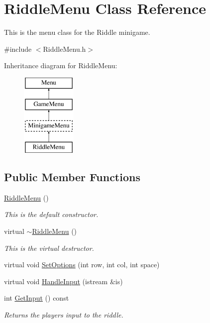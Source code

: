 \hypertarget{classRiddleMenu}{\section{Riddle\-Menu Class Reference}
\label{classRiddleMenu}
}


This is the menu class for the Riddle minigame.  




{\ttfamily \#include $<$Riddle\-Menu.\-h$>$}

Inheritance diagram for Riddle\-Menu\-:\begin{figure}[H]
\begin{center}
\leavevmode
\includegraphics[height=4.000000cm]{classRiddleMenu}
\end{center}
\end{figure}
\subsection*{Public Member Functions}
\begin{DoxyCompactItemize}
\item 
\hyperlink{classRiddleMenu_a68e4be3bbc49bdb2f3d8a9fda74614d9}{Riddle\-Menu} ()
\begin{DoxyCompactList}\small\item\em This is the default constructor. \end{DoxyCompactList}\item 
virtual \hyperlink{classRiddleMenu_a9366deb179c1145947e37d599216d64e}{$\sim$\-Riddle\-Menu} ()
\begin{DoxyCompactList}\small\item\em This is the virtual destructor. \end{DoxyCompactList}\item 
virtual void \hyperlink{classRiddleMenu_a2d103283c58744ffa0e77e62a24e7ccb}{Set\-Options} (int row, int col, int space)
\item 
virtual void \hyperlink{classRiddleMenu_aef67f984c1aad0b8240e03b43ccbe615}{Handle\-Input} (istream \&is)
\item 
int \hyperlink{classRiddleMenu_a462f8a9d922e228c61619396e6ee8dc2}{Get\-Input} () const 
\begin{DoxyCompactList}\small\item\em Returns the players input to the riddle. \end{DoxyCompactList}\end{DoxyCompactItemize}
